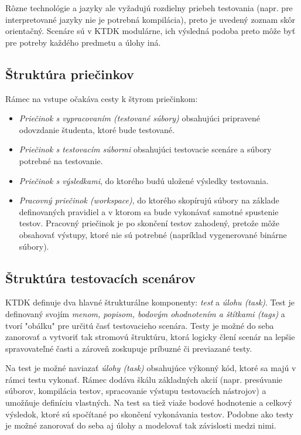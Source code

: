 \documentclass[
  digital, %
  twoside, %
  table,   %
  lof,     %
  lot,     %
]{fithesis3}
\begin{document}
Rôzne technológie a jazyky ale vyžadujú rozdielny priebeh testovania (napr. pre interpretované jazyky nie je potrebná kompilácia), preto je uvedený zoznam skôr orientačný. Scenáre sú v KTDK modulárne, ich výsledná podoba preto môže byť pre potreby každého predmetu a úlohy iná. 

\subsection{Štruktúra priečinkov}

Rámec na vstupe očakáva cesty k štyrom priečinkom:
\begin{itemize}
    \item \emph{Priečinok s vypracovaním (testované súbory)} obsahujúci pripravené odovzdanie študenta, ktoré bude testované.
    \item \emph{Priečinok s testovacím súbormi} obsahujúci testovacie scenáre a súbory potrebné na testovanie.
    \item \emph{Priečinok s výsledkami}, do ktorého budú uložené výsledky testovania.
    \item \emph{Pracovný priečinok (workspace)}, do ktorého skopírujú súbory na základe definovaných pravidiel a v ktorom sa bude vykonávať samotné spustenie testov. Pracovný priečinok je po skončení testov zahodený, pretože môže obsahovať výstupy, ktoré nie sú potrebné (napríklad vygenerované binárne súbory).
\end{itemize}

\subsection{Štruktúra testovacích scenárov}
\label{design-struct-test-scenarios}
KTDK definuje dva hlavné štrukturálne komponenty: \emph{test} a \emph{úlohu (task)}. Test je definovaný svojím \emph{menom, popisom, bodovým ohodnotením a štítkami (\emph{tags})} a tvorí "obálku" pre určitú časť testovacieho scenára. Testy je možné do seba zanorovať a vytvoriť tak stromovú štruktúru, ktorá logicky člení scenár na lepšie spravovateľné časti a zároveň zoskupuje príbuzné či previazané testy. 

Na test je možné naviazať \emph{úlohy (task)} obsahujúce výkonný kód, ktoré sa majú v rámci testu vykonať. Rámec dodáva škálu základných akcií (napr. presúvanie súborov, kompilácia testov, spracovanie výstupu testovacích nástrojov) a umožňuje definíciu vlastných. Na test sa tiež viaže bodové hodnotenie a celkový výsledok, ktoré sú spočítané po skončení vykonávania testov. Podobne ako testy je možné zanorovať do seba aj úlohy a modelovať tak závislosti medzi nimi.
\end{document}
